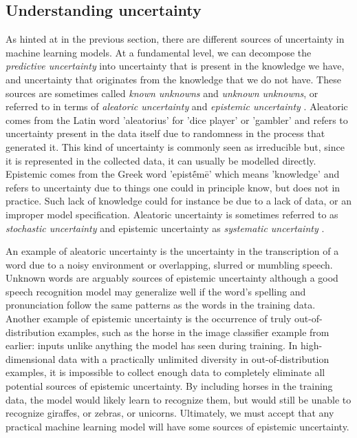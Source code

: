 \subsection{Understanding uncertainty} \label{subsec:understanding-uncertainty}
% 
% 
As hinted at in the previous section, there are different sources of uncertainty in machine learning models. 
At a fundamental level, we can decompose the \textit{predictive uncertainty} into uncertainty that is present in the knowledge we have, and uncertainty that originates from the knowledge that we do not have.
These sources are sometimes called \emph{known unknowns} and \emph{unknown unknowns}, or referred to in terms of \textit{aleatoric uncertainty} and \textit{epistemic uncertainty} \parencite{kendall_what_2017}. 
Aleatoric comes from the Latin word 'aleatorius' for 'dice player' or 'gambler' and refers to uncertainty present in the data itself due to randomness in the process that generated it. This kind of uncertainty is commonly seen as irreducible but, since it is represented in the collected data, it can usually be modelled directly. 
Epistemic comes from the Greek word 'epistḗmē' which means 'knowledge' and refers to uncertainty due to things one could in principle know, but does not in practice. Such lack of knowledge could for instance be due to a lack of data, or an improper model specification. 
Aleatoric uncertainty is sometimes referred to as \textit{stochastic uncertainty} and epistemic uncertainty as \textit{systematic uncertainty} \parencite{kendall_what_2017}. 

An example of aleatoric uncertainty is the uncertainty in the transcription of a word due to a noisy environment or overlapping, slurred or mumbling speech. 
Unknown words are arguably sources of epistemic uncertainty although a good speech recognition model may generalize well if the word's spelling and pronunciation follow the same patterns as the words in the training data. Another example of epistemic uncertainty is the occurrence of truly out-of-distribution examples, such as the horse in the image classifier example from earlier: inputs unlike anything the model has seen during training. %
In high-dimensional data with a practically unlimited diversity in out-of-distribution examples, it is impossible to collect enough data to completely eliminate all potential sources of epistemic uncertainty. By including horses in the training data, the model would likely learn to recognize them, but would still be unable to recognize giraffes, or zebras, or unicorns. 
Ultimately, we must accept that any practical machine learning model will have some sources of epistemic uncertainty. 

